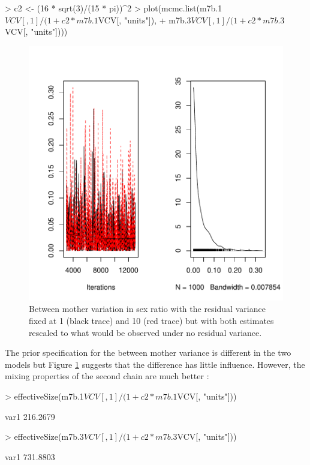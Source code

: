 \documentclass{article}
\begin{document}
\begin{Schunk}
\begin{Sinput}
> c2 <- (16 * sqrt(3)/(15 * pi))^2
> plot(mcmc.list(m7b.1$VCV[, 1]/(1 + c2 * m7b.1$VCV[, "units"]), 
+     m7b.3$VCV[, 1]/(1 + c2 * m7b.3$VCV[, "units"])))
\end{Sinput}
\end{Schunk}

\begin{figure}[!h]
\begin{center}
\includegraphics{Lecture8-022}
\end{center}
\caption{Between mother variation in sex ratio with the residual variance fixed at 1 (black trace) and 10 (red trace) but with both estimates rescaled to what would be observed under no residual variance.}
\label{sexratio2}
\end{figure}


The prior specification for the between mother variance is different in the two models but Figure \ref{sexratio2} suggests that the difference has little influence. However, the mixing properties of the second chain are much better \citep{vanDyk.2001}:

\begin{Schunk}
\begin{Sinput}
> effectiveSize(m7b.1$VCV[, 1]/(1 + c2 * m7b.1$VCV[, "units"]))
\end{Sinput}
\begin{Soutput}
    var1 
216.2679 
\end{Soutput}
\begin{Sinput}
> effectiveSize(m7b.3$VCV[, 1]/(1 + c2 * m7b.3$VCV[, "units"]))
\end{Sinput}
\begin{Soutput}
    var1 
731.8803 
\end{Soutput}
\end{Schunk}
\end{document}
